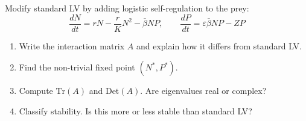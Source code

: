 \documentclass[10pt]{article}
\begin{document}
\begin{problem}
Modify standard LV by adding logistic self-regulation to the prey:
\[
\frac{dN}{dt} = rN - \frac{r}{K}N^2 - \bar\beta NP, \qquad \frac{dP}{dt} = \varepsilon\bar\beta NP - ZP
\]
\begin{enumerate}[label=(\alph*)]
\item Write the interaction matrix $A$ and explain how it differs from standard LV.
\item Find the non-trivial fixed point $(N^*, P^*)$.
\item Compute $\text{Tr}(A)$ and $\text{Det}(A)$. Are eigenvalues real or complex?
\item Classify stability. Is this more or less stable than standard LV?
\end{enumerate}
\end{problem}
\end{document}
